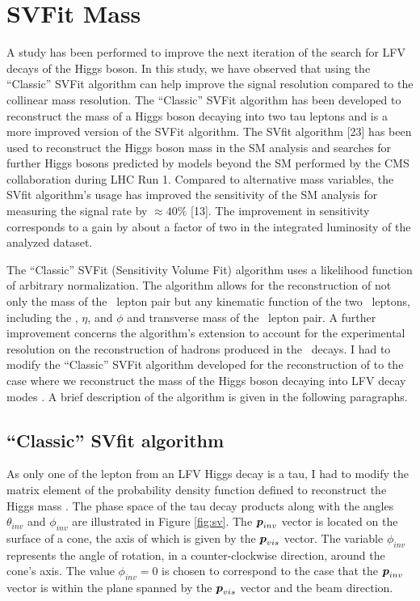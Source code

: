 %
%

\chapter{SVFit Mass}
\label{SVFit}

A study has been performed to improve the next iteration of the search for LFV decays of the Higgs boson. In this study, we have observed that using the ``Classic'' SVFit algorithm can help improve the signal resolution compared to the collinear mass resolution. The ``Classic'' SVFit algorithm has been developed to reconstruct the mass of a Higgs boson decaying into two tau leptons \mtt and is a more improved version of the SVFit algorithm. The SVfit algorithm [23] has been used to reconstruct the Higgs boson mass in the SM \Htt analysis and searches for further Higgs bosons predicted by models beyond the SM performed by the CMS collaboration during LHC Run 1. Compared to alternative mass variables, the SVfit algorithm's usage has improved the sensitivity of the SM \Htt analysis for measuring the signal rate by $\approx 40\%$ [13]. The improvement in sensitivity corresponds to a gain by about a factor of two in the integrated luminosity of the analyzed dataset.

The ``Classic'' SVFit (Sensitivity Volume Fit) algorithm uses a likelihood function of arbitrary normalization. The algorithm allows for the reconstruction of not only the mass \mtt of the \Pgt\, lepton pair but any kinematic function of the two \Pgt\, leptons, including the \pt, $\eta$, and $\phi$ and transverse mass of the \Pgt\, lepton pair. A further improvement concerns the algorithm's extension to account for the experimental resolution on the reconstruction of hadrons produced in the \Pgt\, decays. I had to modify the ``Classic'' SVFit algorithm developed for the reconstruction of \mtt to the case where we reconstruct the mass of the Higgs boson decaying into LFV decay modes \mlt. A brief description of the algorithm is given in the following paragraphs.

\section{``Classic'' SVfit algorithm}
As only one of the lepton from an LFV Higgs decay is a tau, I had to modify the matrix element of the probability density function defined to reconstruct the Higgs mass \mlt. The phase space of the tau decay products along with the angles $\theta_{inv}$ and $\phi_{inv}$ are illustrated in Figure \ref{fig:sv}. The $\boldsymbol{p}_{inv}$ vector is located on the surface of a cone, the axis of which is given by the $\boldsymbol{p}_{vis}$ vector. The variable $\phi_{inv}$ represents the angle of rotation, in a counter-clockwise direction, around the cone's axis. The value $\phi_{inv} = 0$ is chosen to correspond to the case that the $\boldsymbol{p}_{inv}$ vector is within the plane spanned by the $\boldsymbol{p}_{vis}$ vector and the beam direction.

